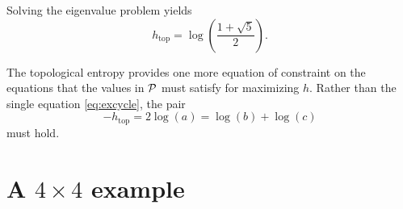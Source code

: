 \documentclass[12pt]{article} \usepackage{amsmath,amsfonts}
\newcommand{\htop}{{h_{\text{top}}}}
\newcommand{\T}{{\cal P}}
\begin{document}
Solving the eigenvalue problem yields
\begin{equation*}
  \htop = \log\left(\frac{1+\sqrt{5}}{2}\right).
\end{equation*}

The topological entropy provides one more equation of constraint on
the equations that the values in $\T$ must satisfy for maximizing $h$.
Rather than the single equation \eqref{eq:excycle}, the pair
\begin{equation*}
  - \htop = 2\log(a) = \log(b) + \log(c)
\end{equation*}
must hold.

\section{A $4\times 4$ example}
\label{sec:fourbyfour}
\end{document}
